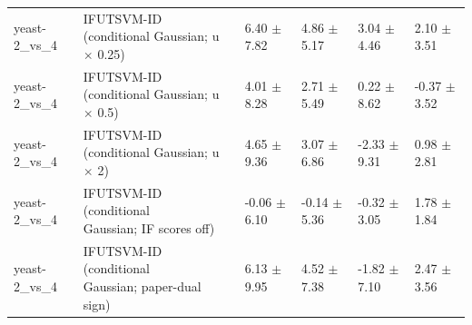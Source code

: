 \begin{table}[!t]
{\begin{tabular}{llllll}
yeast-2\_vs\_4 & \shortstack[l]{IFUTSVM-ID (conditional\\Gaussian; u \(\times\) 0.25)} & 6.40 \(\pm\) 7.82 & 4.86 \(\pm\) 5.17 & 3.04 \(\pm\) 4.46 & 2.10 \(\pm\) 3.51 \\
yeast-2\_vs\_4 & \shortstack[l]{IFUTSVM-ID (conditional\\Gaussian; u \(\times\) 0.5)} & 4.01 \(\pm\) 8.28 & 2.71 \(\pm\) 5.49 & 0.22 \(\pm\) 8.62 & -0.37 \(\pm\) 3.52 \\
yeast-2\_vs\_4 & \shortstack[l]{IFUTSVM-ID (conditional\\Gaussian; u \(\times\) 2)} & 4.65 \(\pm\) 9.36 & 3.07 \(\pm\) 6.86 & -2.33 \(\pm\) 9.31 & 0.98 \(\pm\) 2.81 \\
yeast-2\_vs\_4 & \shortstack[l]{IFUTSVM-ID (conditional\\Gaussian; IF scores off)} & -0.06 \(\pm\) 6.10 & -0.14 \(\pm\) 5.36 & -0.32 \(\pm\) 3.05 & 1.78 \(\pm\) 1.84 \\
yeast-2\_vs\_4 & \shortstack[l]{IFUTSVM-ID (conditional\\Gaussian; paper-dual\\sign)} & 6.13 \(\pm\) 9.95 & 4.52 \(\pm\) 7.38 & -1.82 \(\pm\) 7.10 & 2.47 \(\pm\) 3.56 \\
\hline
\end{tabular}%
}
\end{table}

